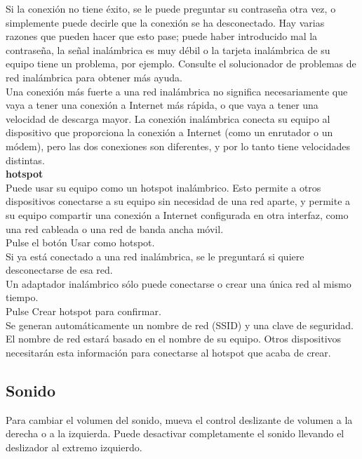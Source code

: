\begin{itemize}
Si la conexión no tiene éxito, se le puede preguntar su contraseña otra vez, o simplemente puede decirle que la conexión se ha desconectado. Hay varias razones que pueden hacer que esto pase; puede haber introducido mal la contraseña, la señal inalámbrica es muy débil o la tarjeta inalámbrica de su equipo tiene un problema, por ejemplo. Consulte el solucionador de problemas de red inalámbrica para obtener más ayuda.\\

Una conexión más fuerte a una red inalámbrica no significa necesariamente que vaya a tener una conexión a Internet más rápida, o que vaya a tener una velocidad de descarga mayor. La conexión inalámbrica conecta su equipo al dispositivo que proporciona la conexión a Internet (como un enrutador o un módem), pero las dos conexiones son diferentes, y por lo tanto tiene velocidades distintas.\\

{\large \bf hotspot}\\
Puede usar su equipo como un hotspot inalámbrico. Esto permite a otros dispositivos conectarse a su equipo sin necesidad de una red aparte, y permite a su equipo compartir una conexión a Internet configurada en otra interfaz, como una red cableada o una red de banda ancha móvil.\\

Pulse el botón Usar como hotspot.\\
Si ya está conectado a una red inalámbrica, se le preguntará si quiere desconectarse de esa red.\\
Un adaptador inalámbrico sólo puede conectarse o crear una única red al mismo tiempo.\\
Pulse Crear hotspot para confirmar.\\

Se generan automáticamente un nombre de red (SSID) y una clave de seguridad. El nombre de red estará basado en el nombre de su equipo. Otros dispositivos necesitarán esta información para conectarse al hotspot que acaba de crear.
\end{itemize}
\subsection{Sonido}
Para cambiar el volumen del sonido, mueva el control deslizante de volumen a la derecha o a la izquierda. Puede desactivar completamente el sonido llevando el deslizador al extremo izquierdo.\\

